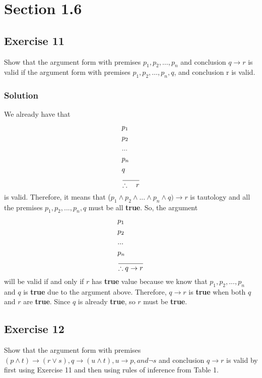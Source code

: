\documentclass{article}
\begin{document}
\section*{Section 1.6}
\subsection*{Exercise 11}
Show that the argument form with premises $p_1, p_2,… , p_n$ and conclusion $q \rightarrow r$ is valid if the argument form with premises $p_1, p_2,… , p_n, q$, and conclusion r is valid.
\subsubsection*{Solution}
We already have that
\begin{align*}
     & p_1                     \\
     & p_2                     \\
     & ...                     \\
     & p_n                     \\
     & q                       \\
     & \over\therefore \quad r
\end{align*}
is valid. Therefore, it means that ($p_1 \land p_2 \land ... \land p_n \land q) \rightarrow r$ is tautology and all the premises $p_1, p_2,...,p_n, q$ must be all \textbf{true}. So, the argument
\begin{align*}
     & p_1                     \\
     & p_2                     \\
     & ...                     \\
     & p_n                     \\
     & \over\therefore q \to r
\end{align*}
will be valid if and only if $r$ has \textbf{true} value because we know that $p_1, p_2,...,p_n$ and $q$ is \textbf{true} due to the argument above. Therefore, $q \to r$ is \textbf{true} when both $q$ and $r$ are \textbf{true}. Since $q$ is already \textbf{true}, so $r$ must be \textbf{true}.
\subsection*{Exercise 12}
Show that the argument form with premises $(p \land t) \to(r \lor s), q \to (u \land t), u \to p, and \lnot s$ and conclusion $q \to r$ is valid by first using Exercise 11 and then using rules of inference from Table 1.
\end{document}
